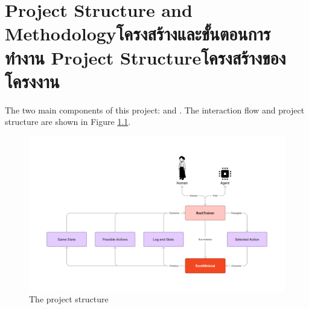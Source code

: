 \chapter{\ifproject%
\ifenglish Project Structure and Methodology\else โครงสร้างและขั้นตอนการทำงาน\fi
\else%
\ifenglish Project Structure\else โครงสร้างของโครงงาน\fi
\fi
}

The two main components of this project: \RootOurs{} and \RootAI. The interaction flow and project structure are shown in Figure \ref{fig:project-structure}.

\begin{figure}[h!]
  \begin{center}
    \includegraphics[width=\textwidth]{images/project-structure.png}
  \end{center}
  \caption{The project structure}
  \label{fig:project-structure}
\end{figure}


\makeatletter


\makeatother

